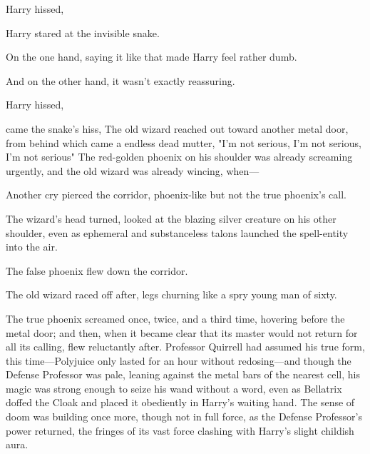  Harry hissed, 


Harry stared at the invisible snake.

On the one hand, saying it like that made Harry feel rather dumb.

And on the other hand, it wasn't exactly reassuring.

 Harry hissed, 

 came the snake's hiss, 
\sbreak
The old wizard reached out toward another metal door, from behind which came a
endless dead mutter, "I'm not serious, I'm not serious, I'm not
serious{\el}" The red-golden phoenix on his shoulder was already screaming
urgently, and the old wizard was already wincing, when---

Another cry pierced the corridor, phoenix-like but not the true phoenix's call.

The wizard's head turned, looked at the blazing silver creature on his other
shoulder, even as ephemeral and substanceless talons launched the spell-entity
into the air.

The false phoenix flew down the corridor.

The old wizard raced off after, legs churning like a spry young man of sixty.

The true phoenix screamed once, twice, and a third time, hovering before the
metal door; and then, when it became clear that its master would not return for
all its calling, flew reluctantly after.
\sbreak
Professor Quirrell had assumed his true form, this time---Polyjuice only lasted
for an hour without redosing---and though the Defense Professor was pale,
leaning against the metal bars of the nearest cell, his magic was strong enough
to seize his wand without a word, even as Bellatrix doffed the Cloak and placed
it obediently in Harry's waiting hand. The sense of doom was building once
more, though not in full force, as the Defense Professor's power returned, the
fringes of its vast force clashing with Harry's slight childish aura.

